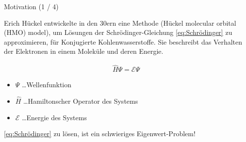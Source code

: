 \documentclass[aspectratio = 169]{beamer}
\begin{document}

\begin{frame}{Motivation (1 / 4)}

    \begin{block}{}

        Erich Hückel entwickelte in den 30ern eine Methode (Hückel molecular orbital (HMO) model), um Lösungen der Schrödinger-Gleichung \eqref{eq:Schrödinger} zu approximieren, für Konjugierte Kohlenwasserstoffe.
        Sie beschreibt das Verhalten der Elektronen in einem Moleküle und deren Energie.

        \begin{align} \label{eq:Schrödinger}
            \hat H \Psi = \mathcal E \Psi
        \end{align}

        \begin{itemize}
            \item $\Psi$ \dots Wellenfunktion
            \item $\hat H$ \dots Hamiltonscher Operator des Systems
            \item $\mathcal E$ \dots Energie des Systems
        \end{itemize}

        \eqref{eq:Schrödinger} zu lösen, ist ein schwieriges Eigenwert-Problem!

    \end{block}

\end{frame}

\end{document}
